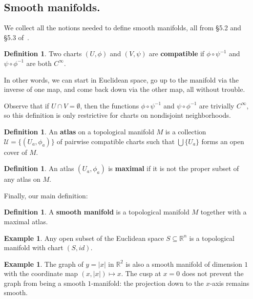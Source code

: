 \documentclass[12pt]{article}
\newcommand{\R}{\mathbb{R}}
\theoremstyle{definition}
\theoremstyle{definition}
\theoremstyle{definition}
\theoremstyle{definition}
\theoremstyle{definition}
\newtheorem{defn}[them]{Definition}
\theoremstyle{definition}
\newtheorem{ex}[them]{Example}
\theoremstyle{definition}
\theoremstyle{definition}
\begin{document}
\subsection{Smooth manifolds.}

\par{We collect all the notions needed to define
smooth manifolds, all from §5.2 and §5.3
of~\cite{Tu}.}

\begin{defn}
Two charts $(U, \phi)$ and $(V, \psi)$ are
\textbf{compatible} if $\phi \circ \psi^{-1}$ and
$\psi \circ \phi^{-1}$ are both $C^\infty$.
\end{defn}

\par{In other words, we can start in Euclidean
space, go up to the manifold via the inverse of
one map, and come back down via the other map,
all without trouble.}

\par{Observe that if $U \cap V =
\emptyset$, then the functions $\phi \circ
\psi^{-1}$ and $\psi \circ \phi^{-1}$ are
trivially $C^\infty$, so this definition is only
restrictive for charts on nondisjoint
neighborhoods.}

\begin{defn}
An \textbf{atlas} on a topological manifold $M$ is a
collection $\mathcal{U} = \{(U_a, \phi_a)\}$ of
pairwise compatible charts such that $\bigcup
\{U_a\}$ forms an open cover of $M$.
\end{defn}

\begin{defn}
An atlas $(U_a, \phi_a)$ is \textbf{maximal} if it
is not the proper subset of any atlas on $M$.
\end{defn}

\par{Finally, our main definition:}

\begin{defn} 
A \textbf{smooth manifold} is a topological
manifold $M$ together with a maximal atlas.
\end{defn}

\begin{ex}
Any open subset of the Euclidean space $S
\subseteq \R^n$ is a topological manifold with
chart $(S, id)$.
\end{ex}

\begin{ex}
The graph of $y = |x|$ in $\R^2$ is also a
smooth manifold of dimension $1$ with the
coordinate map $(x, |x|) \mapsto x$. The cusp at
$x = 0$ does not prevent the graph from being a
smooth $1$-manifold: the projection down to the
$x$-axis remains smooth.
\end{ex}
\end{document}
